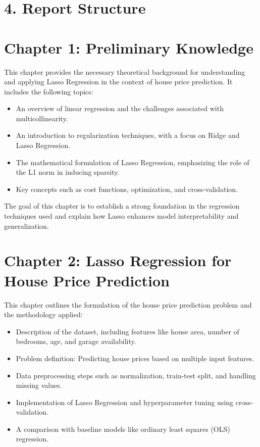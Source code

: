 \documentclass[12pt, a4paper]{report}
\begin{document}
\section*{4. Report Structure}
\section*{Chapter 1: Preliminary Knowledge}

This chapter provides the necessary theoretical background for understanding and applying Lasso Regression in the context of house price prediction. It includes the following topics:

\begin{itemize}
    \item An overview of linear regression and the challenges associated with multicollinearity.
    \item An introduction to regularization techniques, with a focus on Ridge and Lasso Regression.
    \item The mathematical formulation of Lasso Regression, emphasizing the role of the L1 norm in inducing sparsity.
    \item Key concepts such as cost functions, optimization, and cross-validation.
\end{itemize}

The goal of this chapter is to establish a strong foundation in the regression techniques used and explain how Lasso enhances model interpretability and generalization.

\section*{Chapter 2: Lasso Regression for House Price Prediction}

This chapter outlines the formulation of the house price prediction problem and the methodology applied:

\begin{itemize}
    \item Description of the dataset, including features like house area, number of bedrooms, age, and garage availability.
    \item Problem definition: Predicting house prices based on multiple input features.
    \item Data preprocessing steps such as normalization, train-test split, and handling missing values.
    \item Implementation of Lasso Regression and hyperparameter tuning using cross-validation.
    \item A comparison with baseline models like ordinary least squares (OLS) regression.
\end{itemize}
\end{document}
